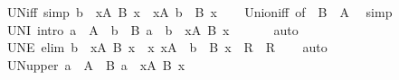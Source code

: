 \begin{isabellebody}
\ UN{\isacharunderscore}{\kern0pt}iff\ {\isacharbrackleft}{\kern0pt}simp{\isacharbrackright}{\kern0pt}{\isacharcolon}{\kern0pt}\ {\isachardoublequoteopen}b\ {\isasymin}\ {\isacharparenleft}{\kern0pt}{\isasymUnion}x{\isasymin}A{\isachardot}{\kern0pt}\ B\ x{\isacharparenright}{\kern0pt}\ {\isasymlongleftrightarrow}\ {\isacharparenleft}{\kern0pt}{\isasymexists}x{\isasymin}A{\isachardot}{\kern0pt}\ b\ {\isasymin}\ B\ x{\isacharparenright}{\kern0pt}{\isachardoublequoteclose}\isanewline
%
\isadelimproof
\ \ %
\endisadelimproof
%
\isatagproof
{}\isamarkupfalse%
\ Union{\isacharunderscore}{\kern0pt}iff\ {\isacharbrackleft}{\kern0pt}of\ {\isacharunderscore}{\kern0pt}\ {\isachardoublequoteopen}B\ {\isacharbackquote}{\kern0pt}\ A{\isachardoublequoteclose}{\isacharbrackright}{\kern0pt}\ \isamarkupfalse%
\ simp%
\endisatagproof
{\isafoldproof}%
%
\isadelimproof
\isanewline
%
\endisadelimproof
\isanewline
{}\isamarkupfalse%
\ UN{\isacharunderscore}{\kern0pt}I\ {\isacharbrackleft}{\kern0pt}intro{\isacharbrackright}{\kern0pt}{\isacharcolon}{\kern0pt}\ {\isachardoublequoteopen}a\ {\isasymin}\ A\ {\isasymLongrightarrow}\ b\ {\isasymin}\ B\ a\ {\isasymLongrightarrow}\ b\ {\isasymin}\ {\isacharparenleft}{\kern0pt}{\isasymUnion}x{\isasymin}A{\isachardot}{\kern0pt}\ B\ x{\isacharparenright}{\kern0pt}{\isachardoublequoteclose}\isanewline
\ \ %
\isanewline
%
\isadelimproof
\ \ %
\endisadelimproof
%
\isatagproof
{}\isamarkupfalse%
\ auto%
\endisatagproof
{\isafoldproof}%
%
\isadelimproof
\isanewline
%
\endisadelimproof
\isanewline
{}\isamarkupfalse%
\ UN{\isacharunderscore}{\kern0pt}E\ {\isacharbrackleft}{\kern0pt}elim{\isacharbang}{\kern0pt}{\isacharbrackright}{\kern0pt}{\isacharcolon}{\kern0pt}\ {\isachardoublequoteopen}b\ {\isasymin}\ {\isacharparenleft}{\kern0pt}{\isasymUnion}x{\isasymin}A{\isachardot}{\kern0pt}\ B\ x{\isacharparenright}{\kern0pt}\ {\isasymLongrightarrow}\ {\isacharparenleft}{\kern0pt}{\isasymAnd}x{\isachardot}{\kern0pt}\ x{\isasymin}A\ {\isasymLongrightarrow}\ b\ {\isasymin}\ B\ x\ {\isasymLongrightarrow}\ R{\isacharparenright}{\kern0pt}\ {\isasymLongrightarrow}\ R{\isachardoublequoteclose}\isanewline
%
\isadelimproof
\ \ %
\endisadelimproof
%
\isatagproof
{}\isamarkupfalse%
\ auto%
\endisatagproof
{\isafoldproof}%
%
\isadelimproof
\isanewline
%
\endisadelimproof
\isanewline
{}\isamarkupfalse%
\ UN{\isacharunderscore}{\kern0pt}upper{\isacharcolon}{\kern0pt}\ {\isachardoublequoteopen}a\ {\isasymin}\ A\ {\isasymLongrightarrow}\ B\ a\ {\isasymsubseteq}\ {\isacharparenleft}{\kern0pt}{\isasymUnion}x{\isasymin}A{\isachardot}{\kern0pt}\ B\ x{\isacharparenright}{\kern0pt}{\isachardoublequoteclose}\isanewline

\end{isabellebody}
